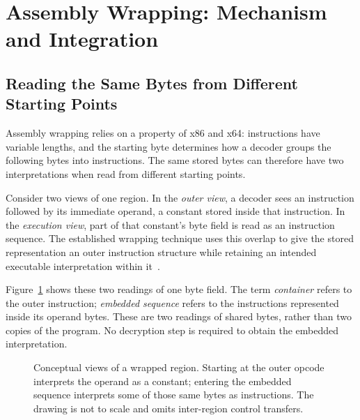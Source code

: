\section{Assembly Wrapping: Mechanism and Integration}\label{sec:wrapping}
\subsection{Reading the Same Bytes from Different Starting Points}
Assembly wrapping relies on a property of x86 and x64: instructions have
variable lengths, and the starting byte determines how a decoder groups
the following bytes into instructions. The same stored bytes can therefore
have two interpretations when read from different starting points.

Consider two views of one region. In the \emph{outer view}, a decoder sees
an instruction followed by its immediate operand, a constant stored inside
that instruction. In the \emph{execution view}, part of that constant's
byte field is read as an instruction sequence. The established wrapping
technique uses this overlap to give the stored representation an outer
instruction structure while retaining an intended executable interpretation
within it~\cite{assembly_wrapping}.

Figure~\ref{fig:wrapping_views} shows these two readings of one byte field.
The term \emph{container} refers to the outer instruction; \emph{embedded
sequence} refers to the instructions represented inside its operand bytes.
These are two readings of shared bytes, rather than two copies of the
program. No decryption step is required to obtain the embedded interpretation.

\begin{figure}[t]
\centering
{}
\caption{Conceptual views of a wrapped region. Starting at the outer
opcode interprets the operand as a constant; entering the embedded
sequence interprets some of those same bytes as instructions.
The drawing is not to scale and omits inter-region control transfers.}
\label{fig:wrapping_views}
\end{figure}

